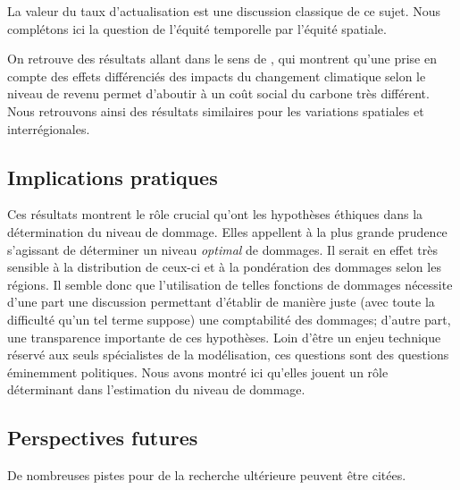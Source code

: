 La valeur du taux d'actualisation est une discussion classique de ce sujet. Nous complétons ici la question de l'équité temporelle par l'équité spatiale. 

On retrouve des résultats allant dans le sens de \cite{dennig_inequality_2015}, qui montrent qu'une prise en compte des effets différenciés des impacts du changement climatique selon le niveau de revenu permet d'aboutir à un coût social du carbone très différent. Nous retrouvons ainsi des résultats similaires pour les variations spatiales et interrégionales. 


\subsection{Implications pratiques}

Ces résultats montrent le rôle crucial qu'ont les hypothèses éthiques dans la détermination du niveau de dommage. Elles appellent à la plus grande prudence s'agissant de déterminer un niveau \emph{optimal} de dommages. Il serait en effet très sensible à la distribution de ceux-ci et à la pondération des dommages selon les régions. Il semble donc que l'utilisation de telles fonctions de dommages nécessite d'une part une discussion permettant d'établir de manière juste (avec toute la difficulté qu'un tel terme suppose) une comptabilité des dommages; d'autre part, une transparence importante de ces hypothèses. Loin d'être un enjeu technique réservé aux seuls spécialistes de la modélisation, ces questions sont des questions éminemment politiques. Nous avons montré ici qu'elles jouent un rôle déterminant dans l'estimation du niveau de dommage. 


\subsection{Perspectives futures}

De nombreuses pistes pour de la recherche ultérieure peuvent être citées. \\

